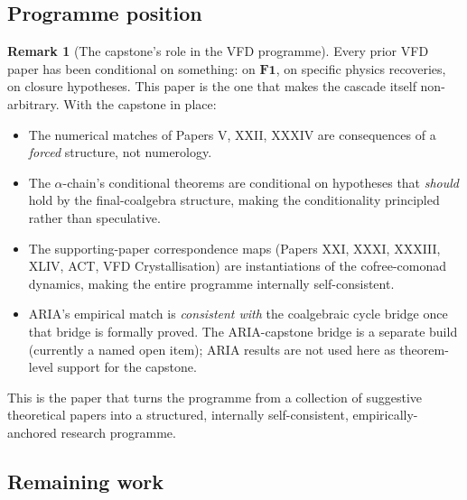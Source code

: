 \documentclass[11pt, a4paper]{amsart}
\theoremstyle{definition}
\newtheorem{remark}[theorem]{Remark}
\begin{document}
\subsection{Programme position}

\begin{remark}[The capstone's role in the VFD programme]
\label{rmk:capstone-role}
Every prior VFD paper has been conditional on something: on
$\mathbf{F1}$, on specific physics recoveries, on closure
hypotheses. This paper is the one that makes the cascade itself
non-arbitrary. With the capstone in place:
\begin{itemize}
\item The numerical matches of Papers V, XXII, XXXIV are
  consequences of a \emph{forced} structure, not numerology.
\item The $\alpha$-chain's conditional theorems are conditional
  on hypotheses that \emph{should} hold by the final-coalgebra
  structure, making the conditionality principled rather than
  speculative.
\item The supporting-paper correspondence maps (Papers XXI,
  XXXI, XXXIII, XLIV, ACT, VFD Crystallisation) are
  instantiations of the cofree-comonad dynamics, making the
  entire programme internally self-consistent.
\item ARIA's empirical match is \emph{consistent with} the
  coalgebraic cycle bridge once that bridge is formally
  proved. The ARIA-capstone bridge is a separate build
  (currently a named open item); ARIA results are not used
  here as theorem-level support for the capstone.
\end{itemize}
This is the paper that turns the programme from a collection of
suggestive theoretical papers into a structured, internally
self-consistent, empirically-anchored research programme.
\end{remark}

\subsection{Remaining work}
\end{document}
